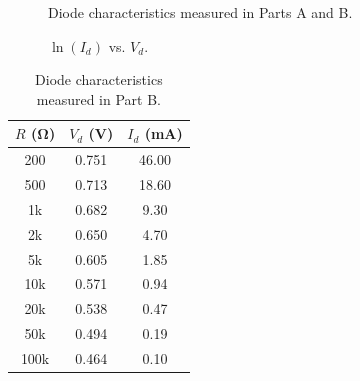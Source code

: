 \documentclass{article}
\begin{document}
\begin{figure}[hbtp]
  \centering
  
  \caption{\label{fig:combined_graph} Diode characteristics measured in Parts A and B.}
\end{figure}

%   

\begin{figure}[hbtp]
  \centering
  
  \caption{\label{fig:part_a_graph2} $\ln{(I_d)}$ vs. $V_d$.}
\end{figure}


\begin{table}[hbtp]
  \centering
  \begin{tabular}{ccc}
    $R$ (\si{\ohm}) & $V_d$ (\si{V}) & $I_d$ (\si{mA}) \\
    \hline
    200 & 0.751 & 46.00 \\
    500 & 0.713 & 18.60 \\
    1k & 0.682 & 9.30 \\
    2k & 0.650 & 4.70 \\
    5k & 0.605 & 1.85 \\
    10k & 0.571 & 0.94 \\
    20k & 0.538 & 0.47 \\
    50k & 0.494 & 0.19 \\
    100k & 0.464 & 0.10 \\
  \end{tabular}
  \caption{\label{tab:part_b} Diode characteristics measured in Part B.}
\end{table}

%   

\end{document}
